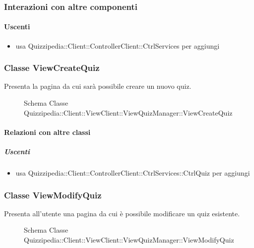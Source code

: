 \subsubsection{Interazioni con altre componenti}
\paragraph{Uscenti}
\begin{itemize}
\item usa Quizzipedia::Client::ControllerClient::CtrlServices per aggiungi
\end{itemize}
\subsubsection{Classe ViewCreateQuiz}
Presenta la pagina da cui sarà possibile creare un nuovo quiz.
\begin{figure}[H]
\centering
\noindent{}
\caption[Schema Classe ViewCreateQuiz]{Schema Classe Quizzipedia::Client::ViewClient::ViewQuizManager::ViewCreateQuiz}
\end{figure}
\paragraph{Relazioni con altre classi}
\subparagraph{Uscenti}
\begin{itemize}
\item usa Quizzipedia::Client::ControllerClient::CtrlServices::CtrlQuiz per aggiungi
\end{itemize}
\subsubsection{Classe ViewModifyQuiz}
Presenta all'utente una pagina da cui è possibile modificare un quiz esistente.
\begin{figure}[H]
\centering
\noindent{}
\caption[Schema Classe ViewModifyQuiz]{Schema Classe Quizzipedia::Client::ViewClient::ViewQuizManager::ViewModifyQuiz}
\end{figure}
